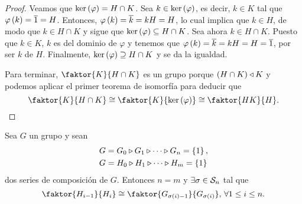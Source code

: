 \begin{proof}
    \noindent Veamos que $\ker\left(\varphi\right)=H\cap K$. Sea $k\in\ker\left(\varphi\right)$, es decir, $k\in K$ tal que $\varphi\left( k\right)=\overline{1}=H$. Entonces, $\varphi\left( k\right)=\overline{k}=kH=H$, lo cual implica que $k\in H$, de modo que $k\in H\cap K$ y sigue que $\ker\left(\varphi\right)\subseteq H\cap K$. Sea ahora $k\in H\cap K$. Puesto que $k\in K$, $k$ es del dominio de $\varphi$ y tenemos que $\varphi\left( k\right) = \overline{k}=kH=H=\overline{1}$, por ser $k$ de $H$. Finalmente, $\ker\left(\varphi\right)\supseteq H\cap K$ y se da la igualdad.
    
    \noindent Para terminar, $\faktor{K}{H\cap K}$ es un grupo porque $\left( H\cap K\right)\triangleleft K$ y podemos aplicar el primer teorema de isomorfía para deducir que
    \[
        \faktor{K}{H\cap K}\cong\faktor{K}{\ker\lp\varphi\rp}\cong\faktor{HK}{H}.
    \]
\end{proof}

\begin{teo}
    Sea $G$ un grupo y sean
    \[
        \begin{aligned}
            G &= G_0 \triangleright G_1 \triangleright \cdots \triangleright G_n = \left\{1\right\}, \\
            G &= H_0 \triangleright H_1 \triangleright \cdots \triangleright H_m = \left\{1\right\}
        \end{aligned}
    \]
    dos series de composición de $G$. Entonces $n = m$ y $\exists \sigma \in \mathcal{S}_n$ tal que
    \begin{equation}\label{equation:series_equivalentes}
        \faktor{H_{i-1}}{H_i} \cong \faktor{G_{\sigma(i)-1}}{G_{\sigma(i)}},\,\forall 1\leq i\leq n.
    \end{equation}
\end{teo}

